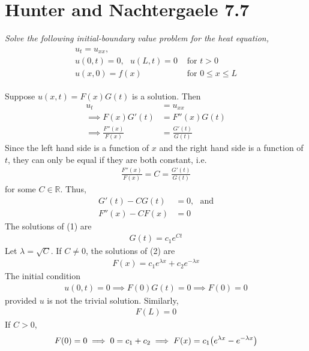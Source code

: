 \documentclass[paper=a4, fontsize=11pt]{scrartcl} %
\theoremstyle{plain}
\numberwithin{equation}{section} %
\numberwithin{figure}{section} %
\numberwithin{table}{section} %
\begin{document}
\section{Hunter and Nachtergaele 7.7}
\emph{Solve the following initial-boundary value problem for the heat equation,}
\begin{align*}
    \begin{array}{ll}
    u_t = u_{xx}, & \\
    u(0, t) = 0,\ \ \ u(L,t) = 0 & \text{ for } t > 0 \\
    u(x, 0) = f(x) & \text{ for } 0 \leq x \leq L
    \end{array}
\end{align*}

Suppose $u(x,t) = F(x)G(t)$ is a solution.  Then
\begin{align*}
    u_t &= u_{xx} \\
    \implies F(x)G'(t) &= F''(x)G(t) \\
    \implies \frac{F''(x)}{F(x)} &= \frac{G'(t)}{G(t)}
\end{align*}
Since the left hand side is a function of $x$ and the right hand side is a function of $t$, they can only be equal if they are both constant, i.e.
\begin{align*}
    \frac{F''(x)}{F(x)} = C = \frac{G'(t)}{G(t)}
\end{align*}
for some $C \in \mathbb{R}$.  Thus,
\begin{align}
    G'(t) - C G(t) &= 0,\ \ \ \text{and} \\
    F''(x) - C F(x) &= 0
\end{align}
The solutions of (1) are
\begin{align*}
    G(t) = c_1 e^{Ct}
\end{align*}
Let $\lambda = \sqrt{C}$.  If $C \neq 0$, the solutions of (2) are
\begin{align*}
    F(x) = c_1 e^{\lambda x} + c_2 e^{-\lambda x}
\end{align*}
The initial condition
\begin{align*}
    u(0,t) = 0 \implies F(0)G(t) = 0 \implies F(0) = 0
\end{align*}
provided $u$ is not the trivial solution.  Similarly,
\begin{align*}
    F(L) = 0
\end{align*}
If $C > 0$,
\begin{align*}
    F(0) = 0 \implies 0 = c_1 + c_2 \implies F(x) = c_1\qty(e^{\lambda x} - e^{-\lambda x})
\end{align*}
\end{document}
